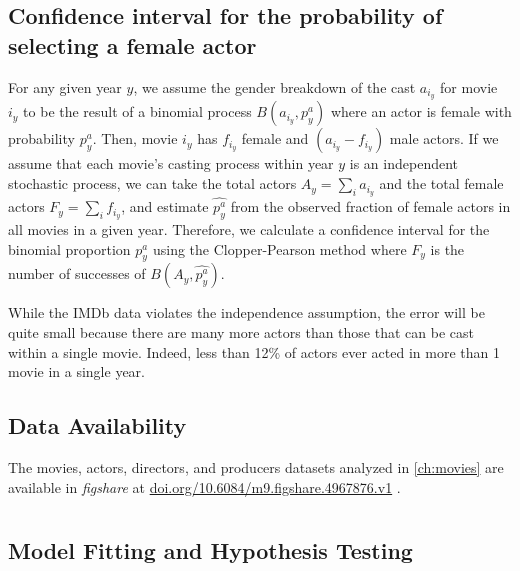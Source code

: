 \subsection{Confidence interval for the probability of selecting a female actor}

For any given year $y$, we assume the gender breakdown of the cast $a_{i_y}$ for movie $i_y$ to be the result of a binomial process $B(a_{i_y}, p^a_y)$ where an actor is female with probability $p^a_y$. Then, movie $i_y$ has $f_{i_y}$ female and $(a_{i_y} - f_{i_y})$ male actors. If we assume that each movie's casting process within year $y$ is an independent stochastic process, we can take the total actors $A_y = \sum_{i} a_{i_y}$ and the total female actors $F_y = \sum_{i} f_{i_y}$, and estimate $\widehat{p^a_y}$ from the observed fraction of female actors in all movies in a given year. Therefore, we calculate a confidence interval for the binomial proportion $p^a_y$ using the Clopper-Pearson method \cite{Clopper1934} where $F_y$ is the number of successes of $B(A_y, \widehat{p^a_y})$.

While the IMDb data violates the independence assumption, the error will be quite small because there are many more actors than those that can be cast within a single movie. Indeed, less than 12\% of actors ever acted in more than 1 movie in a single year.


\subsection{Data Availability}

The movies, actors, directors, and producers datasets analyzed in \autoref{ch:movies} are available in \textit{figshare} at \href{https://doi.org/10.6084/m9.figshare.4967876.v1}{doi.org/10.6084/m9.figshare.4967876.v1} \cite{Moreira2017}.


\section{}
\label{sec:methods:lognormal}

\subsection{Model Fitting and Hypothesis Testing}

